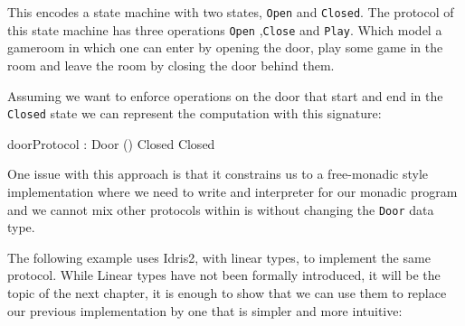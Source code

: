 \documentclass[
]{article}
\newenvironment{Shaded}{}{}
\newcommand{\DataTypeTok}[1]{\textcolor[rgb]{0.56,0.13,0.00}{#1}}
\newcommand{\NormalTok}[1]{#1}
\newcommand{\OperatorTok}[1]{\textcolor[rgb]{0.40,0.40,0.40}{#1}}
\begin{document}
This encodes a state machine with two states, \texttt{Open} and
\texttt{Closed}. The protocol of this state machine has three operations
\texttt{Open} ,\texttt{Close} and \texttt{Play}. Which model a gameroom
in which one can enter by opening the door, play some game in the room
and leave the room by closing the door behind them.

Assuming we want to enforce operations on the door that start and end in
the \texttt{Closed} state we can represent the computation with this
signature:

\begin{Shaded}
\begin{Highlighting}[]
\NormalTok{doorProtocol }\OperatorTok{:} \DataTypeTok{Door}\NormalTok{ () }\DataTypeTok{Closed} \DataTypeTok{Closed}
\end{Highlighting}
\end{Shaded}

One issue with this approach is that it constrains us to a free-monadic
style implementation where we need to write and interpreter for our
monadic program and we cannot mix other protocols within is without
changing the \texttt{Door} data type.

The following example uses Idris2, with linear types, to implement the
same protocol. While Linear types have not been formally introduced, it
will be the topic of the next chapter, it is enough to show that we can
use them to replace our previous implementation by one that is simpler
and more intuitive:
\end{document}
